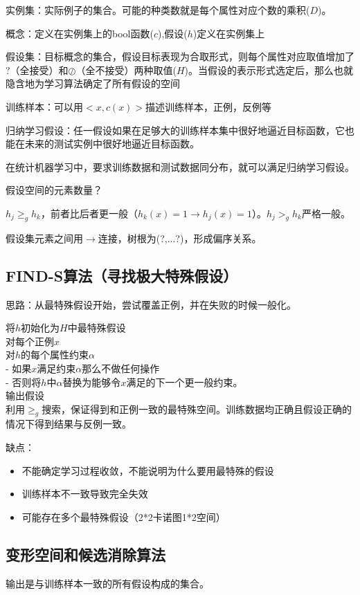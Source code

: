 \documentclass[UTF8,a4paper,landscape,16pt]{paper}
\begin{document}
\begin{multicols}{4}
\noindent 实例集：实际例子的集合。可能的种类数就是每个属性对应个数的乘积($D$)。

\noindent 概念：定义在实例集上的bool函数($c$),假设($h$)定义在实例集上

\noindent 假设集：目标概念的集合，假设目标表现为合取形式，则每个属性对应取值增加了$?$（全接受）和$\oslash$（全不接受）两种取值($H$)。当假设的表示形式选定后，那么也就隐含地为学习算法确定了所有假设的空间

\noindent 训练样本：可以用$<x,c(x)>$描述训练样本，正例，反例等

\noindent 归纳学习假设：任一假设如果在足够大的训练样本集中很好地逼近目标函数，它也能在未来的测试实例中很好地逼近目标函数。

\noindent 在统计机器学习中，要求训练数据和测试数据同分布，就可以满足归纳学习假设。

\noindent 假设空间的元素数量？

\noindent $h_j \ge_g h_k$，前者比后者更一般（$h_k(x)=1 \rightarrow h_j(x)=1$）。$h_j >_g h_k$严格一般。

\noindent 假设集元素之间用$\rightarrow$连接，树根为(?,...?)，形成偏序关系。

\subsection{FIND-S算法（寻找极大特殊假设）}
\noindent 思路：从最特殊假设开始，尝试覆盖正例，并在失败的时候一般化。

\noindent 将$h$初始化为$H$中最特殊假设\\
对每个正例$x$\\
对$h$的每个属性约束$\alpha$\\ 
- 如果$x$满足约束$\alpha$那么不做任何操作\\
- 否则将$h$中$\alpha$替换为能够令$x$满足的下一个更一般约束。\\
输出假设\\

\noindent 利用$\ge_g$搜索，保证得到和正例一致的最特殊空间。训练数据均正确且假设正确的情况下得到结果与反例一致。

\noindent 缺点：
\begin{itemize}
\item 不能确定学习过程收敛，不能说明为什么要用最特殊的假设
\item 训练样本不一致导致完全失效
\item 可能存在多个最特殊假设（2*2卡诺图1*2空间）
\end{itemize}

\subsection{变形空间和候选消除算法}
\noindent 输出是与训练样本一致的所有假设构成的集合。


\end{multicols}
\end{document}
